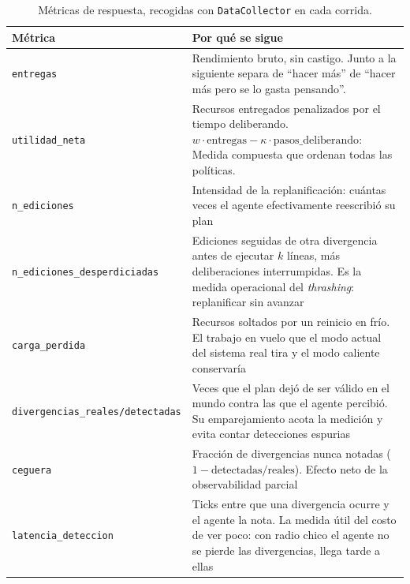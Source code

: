 \begin{table}[ht]
\centering
\small
\begin{tabular}{@{}l L{7.2cm}@{}}
\toprule
\textbf{Métrica} & \textbf{Por qué se sigue} \\
\midrule
\texttt{entregas} & Rendimiento bruto, sin castigo. Junto a la siguiente separa de ``hacer más'' de ``hacer más pero se lo gasta pensando''.\\
\texttt{utilidad\_neta} & Recursos entregados penalizados por el tiempo deliberando. $w\cdot\text{entregas} - \kappa\cdot\text{pasos\_deliberando}$: Medida compuesta que ordenan todas las políticas. \\
\texttt{n\_ediciones} & Intensidad de la replanificación: cuántas veces el agente
 efectivamente reescribió su plan \\
\texttt{n\_ediciones\_desperdiciadas} & Ediciones seguidas de otra divergencia antes de
ejecutar $k$ líneas, más deliberaciones interrumpidas. Es la medida operacional del
\emph{thrashing}: replanificar sin avanzar \\
\texttt{carga\_perdida} & Recursos soltados por un reinicio en frío. El trabajo en
vuelo que el modo actual del sistema real tira y el modo caliente conservaría \\
\texttt{divergencias\_reales/detectadas} & Veces que el plan dejó de ser válido en el
mundo contra las que el agente percibió. Su emparejamiento acota la medición y evita
contar detecciones espurias \\
\texttt{ceguera} & Fracción de divergencias nunca notadas ($1 -
\text{detectadas}/\text{reales}$). Efecto neto de la observabilidad parcial \\
\texttt{latencia\_deteccion} & Ticks entre que una divergencia ocurre y el agente la
nota. La medida útil del costo de ver poco: con radio chico el agente no se pierde las
divergencias, llega tarde a ellas \\
\bottomrule
\end{tabular}
\caption{Métricas de respuesta, recogidas con \texttt{DataCollector} en cada corrida.}
\end{table}

